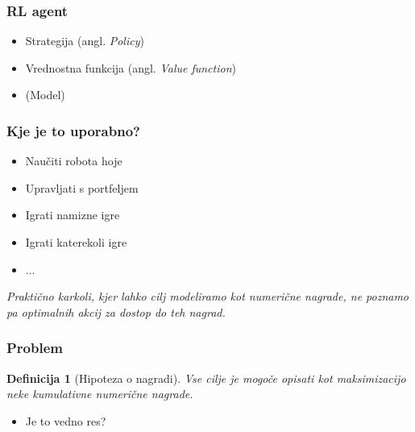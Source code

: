 \documentclass{beamer}    %
\newtheorem{definicija}[izrek]{Definicija}
\begin{document}
\begin{frame}
    \frametitle{RL agent}
    \begin{itemize}
        \item Strategija (angl. \textit{Policy})
        \item Vrednostna funkcija (angl. \textit{Value function})
        \item (Model)
    \end{itemize}
\end{frame}


\begin{frame}
    \frametitle{Kje je to uporabno?}
    \begin{itemize}
        \item Naučiti robota hoje
        \item Upravljati s portfeljem
        \item Igrati namizne igre
        \item Igrati katerekoli igre
        \item ...
    \end{itemize}
    \medskip
    \emph{Praktično karkoli, kjer lahko cilj modeliramo kot numerične
    nagrade, ne poznamo pa optimalnih akcij za dostop do teh nagrad.}
\end{frame}


\begin{frame}
    \frametitle{Problem}
    \begin{definicija}[Hipoteza o nagradi]
        Vse cilje je mogoče opisati kot maksimizacijo neke kumulativne numerične 
        nagrade.
    \end{definicija}

    \medskip

    \begin{itemize}
        \item Je to vedno res?
    \end{itemize}
\end{frame}
\end{document}
